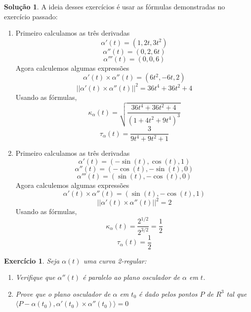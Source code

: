 \documentclass[a4paper,12pt]{article}
\theoremstyle{exer}
\newtheorem{exercise}{Exercício}
\theoremstyle{definition}
\newtheorem{solution}{Solução}
\theoremstyle{plain}
\begin{document}
\begin{solution}
    A ideia desses exercícios é usar as fórmulas demonstradas no exercício
    passado:
    \begin{enumerate}
        \item[(a)] Primeiro calculamos as três derivadas
        $$
        \alpha'(t) = (1,2t,3t^2)
        $$
        $$
        \alpha''(t) = (0,2,6t)
        $$
        $$
        \alpha'''(t) = (0,0,6)
        $$
        Agora calculemos algumas expressões
        $$
        \alpha'(t) \times \alpha''(t) = (6t^2, -6t, 2)
        $$
        $$
        ||\alpha'(t) \times \alpha''(t)||^2 = 36t^4 + 36t^2 + 4
        $$
        Usando as fórmulas, 
        $$
        \kappa_{\alpha}(t) = \sqrt{\frac{36t^4 + 36t^2 + 4}{(1 + 4t^2 + 9t^4)^3}}
        $$
        $$
        \tau_{\alpha}(t) = \frac{3}{9t^4 + 9t^2 + 1}
        $$
        \item[(b)] Primeiro calculamos as três derivadas
        $$
        \alpha'(t) = (-\sin(t),\cos(t),1)
        $$
        $$
        \alpha''(t) = (-\cos(t),-\sin(t),0)
        $$
        $$
        \alpha'''(t) = (\sin(t),-\cos(t),0)
        $$
        Agora calculemos algumas expressões
        $$
        \alpha'(t) \times \alpha''(t) = (\sin(t),-\cos(t),1)
        $$
        $$
        ||\alpha'(t) \times \alpha''(t)||^2 = 2
        $$
        Usando as fórmulas, 
        $$
        \kappa_{\alpha}(t) = \frac{2^{1/2}}{2^{3/2}} = \frac{1}{2}
        $$
        $$
        \tau_{\alpha}(t) = \frac{1}{2}
        $$
    \end{enumerate}
\end{solution}

\begin{exercise}
    Seja $\alpha(t)$ uma curva 2-regular:
    \begin{enumerate}
        \item[(a)] Verifique que $\alpha''(t)$ é paralelo ao plano osculador de $\alpha$ em $t$.
        \item[(b)] Prove que o plano osculador de $\alpha$ em $t_0$ é dado
        pelos pontos $P$ de $R^3$ tal que $\langle P - \alpha(t_0), \alpha
        '(t_0) \times \alpha''(t_0) \rangle = 0$
    \end{enumerate}
\end{exercise}
\end{document}
